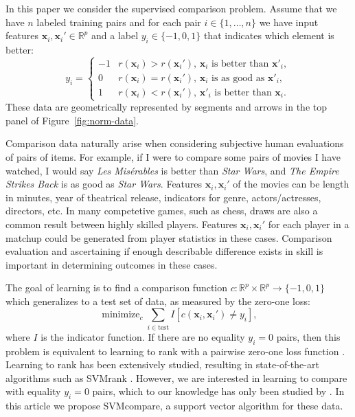 \documentclass[twoside,11pt]{article}
\newcommand{\RR}{\mathbb R}
\DeclareMathOperator*{\minimize}{minimize}
\begin{document}
In this paper we consider the supervised comparison problem. Assume
that we have $n$ labeled training pairs and for each pair
$i\in\{1,\dots,n\}$ we have input features $\mathbf x_i,\mathbf
x_i'\in\RR^p$ and a label $y_i\in\{-1,0,1\}$ that indicates which
element is better:
\begin{equation}
  \label{eq:z}
  y_i =
  \begin{cases}
    -1 &  r(\mathbf x_i)>r(\mathbf x_i')
    \text{, $\mathbf x_i$ is better than $\mathbf x'_i$},\\
    0 & r(\mathbf x_i) = r(\mathbf x_i')
    \text{, $\mathbf x_i$ is as good as $\mathbf x'_i$},\\
    1 & r(\mathbf x_i)<r(\mathbf x_i')
    \text{, $\mathbf x'_i$ is better than $\mathbf x_i$}.
  \end{cases}
\end{equation}
These data are geometrically represented by segments and arrows in the
top panel of Figure~\ref{fig:norm-data}. 

Comparison data naturally arise when considering subjective human
evaluations of pairs of items. For example, if I were to compare some
pairs of movies I have watched, I would say \textit{Les Mis\'erables}
is better than \textit{Star Wars}, and \textit{The Empire Strikes
  Back} is as good as \textit{Star Wars}. Features $\mathbf
x_i,\mathbf x_i'$ of the movies can be length in minutes, year of
theatrical release, indicators for genre, actors/actresses, directors,
etc.  In many competetive games, such as chess, draws are also a common result between highly skilled players.  Features $\mathbf
x_i,\mathbf x_i'$ for each player in a matchup could be generated from player statistics in these cases.  Comparison evaluation and ascertaining if enough describable difference exists in skill is important in determining outcomes in these cases.

The goal of learning is to find a comparison function $c:\RR^p \times
\RR^p \rightarrow \{-1,0,1\}$ which generalizes to a test set of data,
as measured by the zero-one loss:
\begin{equation}
  \label{eq:min_c}
  \minimize_{c} 
  \sum_{i\in\text{test}}
  I\left[ c(\mathbf x_i, \mathbf x_i')\neq y_i \right],
\end{equation}
where $I$ is the indicator function. If there are no equality $y_i=0$
pairs, then this problem is equivalent to learning to rank with a
pairwise zero-one loss function \citep{learning-to-rank}. Learning to
rank has been extensively studied, resulting in state-of-the-art
algorithms such as SVMrank \citep{ranksvm}. However, we are interested
in learning to compare with equality $y_i=0$ pairs, which to our
knowledge has only been studied by \citet{rank-with-ties}. In this
article we propose SVMcompare, a support vector algorithm for these
data.
\end{document}
